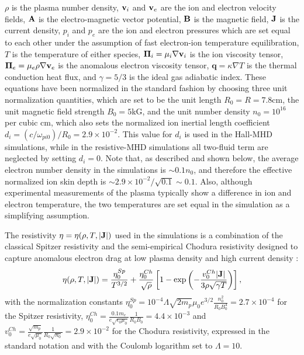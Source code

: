 $\rho$ is the plasma number density, $\mathbf{v}_i$ and $\mathbf{v}_e$ are the ion and electron velocity fields, $\mathbf{A}$ is the electro-magnetic vector potential, $\mathbf{B}$ is the magnetic field, $\mathbf{J}$ is the current density, $p_i$ and $p_e$ are the ion and electron pressures which are set equal to each other under the assumption of fast electron-ion temperature equilibration, $T$ is the temperature of either species,  $\mathbf{\Pi}_i=\mu_i\nabla\mathbf{v}_i$ is the ion viscosity tensor, $\mathbf{\Pi}_e=\mu_e\rho\nabla\mathbf{v}_e$ is the anomalous electron viscosity tensor, $\mathbf{q}=\kappa\nabla T$ is the thermal conduction heat flux, and $\gamma=5/3$ is the ideal gas adiabatic index.  These equations have been normalized in the standard fashion \cite{Lukin11} by choosing three unit normalization quantities, which are set to be the unit length $R_0=R=7.8$cm, the unit magnetic field strength $B_0 = 5$kG, and the unit number density $n_0=10^{16}$ per cubic cm, which also sets the normalized ion inertial length coefficient $d_i=(c/\omega_{pi0})/R_0 = 2.9\times 10^{-2}$.  This value for $d_i$ is used in the Hall-MHD simulations, while in the resistive-MHD simulations all two-fluid term are neglected by setting $d_i=0$. Note that, as described and shown below, the average electron number density in the simulations is $\sim 0.1 n_0$, and therefore the effective normalized ion skin depth is $\sim 2.9\times 10^{-2}/\sqrt{0.1} \sim 0.1$. Also, although experimental measurements of the plasma typically show a difference in ion and electron temperature, the two temperatures are set equal in the simulation as a simplifying assumption.

The resistivity $\eta=\eta(\rho,T,|\mathbf{J}|)$ used in the simulations is a combination of the classical Spitzer resistivity and the semi-empirical Chodura resistivity designed to capture anomalous electron drag at low plasma density and high current density \cite{Chodura75,Sgro76,Meier11}:
\begin{equation}
\eta(\rho,T,|\mathbf{J}|) = \frac{\eta_0^{Sp}}{T^{3/2}} + \frac{\eta_0^{Ch}}{\sqrt{\rho}}\left[1 - \exp\left(-\frac{v_0^{Ch}|\mathbf{J}|}{3\rho\sqrt{\gamma T}}\right)\right],
\end{equation}
with the normalization constants $\eta_0^{Sp} = 10^{-4}\Lambda\sqrt{2 m_p}\mu_0 e^{3/2}\frac{n_0^2}{R_0 B_0^4} = 2.7\times 10^{-4}$ for the Spitzer resistivity, $\eta_0^{Ch} = \frac{0.1 m_e}{e\sqrt{\epsilon_0 \mu_0}}\frac{1}{R_0 B_0} = 4.4\times10^{-3}$ and $v_0^{Ch} = \frac{\sqrt{m_p}}{e\sqrt{\mu_0}}\frac{1}{R_0\sqrt{n_0}}=2.9\times10^{-2}$ for the Chodura resistivity, expressed in the standard notation and with the Coulomb logarithm set to $\Lambda=10$.
 
